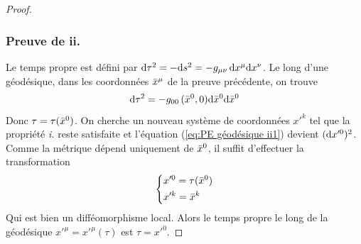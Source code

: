 \begin{proof}
    \subsubsection{Preuve de ii.}
    Le temps propre est défini par $\mathrm{d} \tau ^2 = -\mathrm{d} s^2 = -g_{\mu \nu}\,\mathrm{d} x^{\mu} \mathrm{d} x^{\nu}$. Le long d'une géodésique, dans les coordonnées $\Bar{x}^\mu$ de la preuve précédente, on trouve
    \begin{equation}
        \label{eq:PE géodésique ii1}
        \mathrm{d} \tau ^2 = -g_{0 0}\,(\Bar{x}^0, 0)\mathrm{d} \Bar{x}^{0} \mathrm{d} \Bar{x}^{0}
    \end{equation}
    Donc $\tau = \tau(\Bar{x}^0)$. On cherche un nouveau système de coordonnées $x'^k$ tel que la propriété \emph{i.} reste satisfaite et l'équation (\ref{eq:PE géodésique ii1}) devient $(\mathrm{d} x'^0)^2$. Comme la métrique dépend uniquement de $\Bar{x}^0$, il suffit d'effectuer la transformation
    \begin{equation}
        \begin{dcases}
            x'^0 = \tau(\Bar{x}^0)\\
            x'^k = \Bar{x}^k
        \end{dcases}
    \end{equation}
    Qui est bien un difféomorphisme local. Alors le temps propre le long de la géodésique $x'^{\mu} = x'^{\mu}(\tau)$ est $\tau = x'^{0}$.
    

\end{proof}
